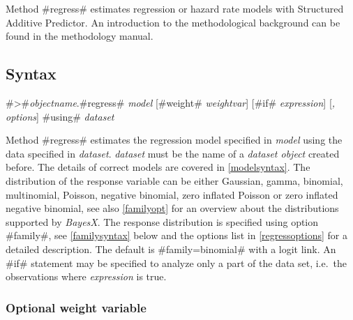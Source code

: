 Method #regress# estimates regression or hazard rate models with
Structured Additive Predictor. An introduction to the methodological
background can be found in the methodology manual.

     



\subsection{Syntax}
\label{bayesregregresssyntax}

 #>#{\em objectname}.#regress# {\em model} [#weight# {\em weightvar}] [#if# {\em expression}] [{\em , options}] #using# {\em dataset}

Method #regress# estimates the regression model specified in {\em
model} using the data specified in {\em dataset}. {\em dataset}
must be the name of a {\em dataset object} created before. The
details of correct models are covered in \autoref{modelsyntax}.
The distribution of the response variable can be either Gaussian,
gamma, binomial, multinomial, Poisson, negative binomial,
zero inflated Poisson or zero inflated negative binomial, see
also \autoref{familyopt} for an overview about the distributions
supported by {\em BayesX}. The response distribution is specified
using option #family#, see \autoref{familysyntax} below and the
options list in \autoref{regressoptions} for a detailed
description. The default is #family=binomial# with a logit link.
An #if# statement may be specified to analyze only a part of the
data set, i.e.~the observations where {\em expression} is true.

\subsubsection{Optional weight variable }
\label{weightspecification}

